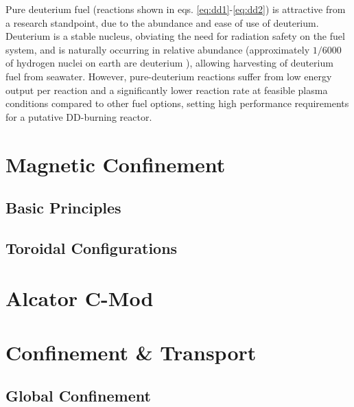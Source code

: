 Pure deuterium fuel (reactions shown in eqs. \ref{eq:dd1}-\ref{eq:dd2}) is attractive from a research standpoint, due to the abundance and ease of use of deuterium.  Deuterium is a stable nucleus, obviating the need for radiation safety on the fuel system, and is naturally occurring in relative abundance (approximately $1/6000$ of hydrogen nuclei on earth are deuterium ), allowing harvesting of deuterium fuel from seawater.  However, pure-deuterium reactions suffer from low energy output per reaction  and a significantly lower reaction rate at feasible plasma conditions compared to other fuel options, setting high performance requirements for a putative DD-burning reactor.




\section{Magnetic Confinement}\label{sec:intro_magnetic}

\subsection{Basic Principles}\label{subsec:intro_basic}

\subsection{Toroidal Configurations}\label{subsec:intro_toroidal}


\section{Alcator C-Mod}\label{sec:intro_cmod}


\section{Confinement \& Transport}\label{sec:intro_confinement}

\subsection{Global Confinement}\label{subsec:intro_global}

